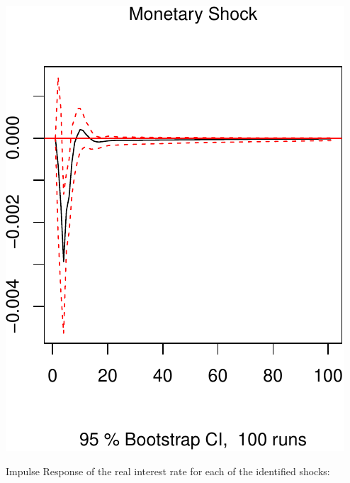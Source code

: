 \documentclass[11pt,preprint, authoryear]{elsarticle}
\numberwithin{equation}{section}
\numberwithin{figure}{section}
\numberwithin{table}{section}
\begin{document}
\includegraphics{TS_proj_files/figure-latex/unnamed-chunk-39-3.pdf}

Impulse Response of the real interest rate for each of the identified
shocks:
\end{document}
